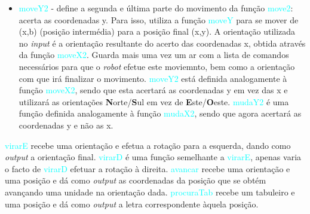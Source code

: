 \documentclass[12pt,a4paper]{article}
\begin{document}
\begin{itemize}
\item \textsf{ \textcolor{cyan}{moveY2} - define a segunda e última parte do movimento da fun\c{c}ão \textcolor{cyan}{move2}: acerta as coordenadas y. Para isso, utiliza a fun\c{c}ão \textcolor{cyan}{moveY} para se mover de (x,b) (posi\c{c}ão intermédia) para a posi\c{c}ão final (x,y). A orienta\c{c}ão utilizada no \textit{input} é a orienta\c{c}ão resultante do acerto das coordenadas x, obtida através da fun\c{c}ão \textcolor{cyan}{moveX2}. Guarda mais uma vez um ar com a lista de comandos necessários para que o \textit{robot} efetue este moviemnto, bem como a orienta\c{c}ão com que irá finalizar o movimento. \textcolor{cyan}{moveY2} está definida analogamente à fun\c{c}ão \textcolor{cyan}{moveX2}, sendo que esta acertará as coordenadas y em vez das x e utilizará as orienta\c{c}ões
\textbf{N}orte/\textbf{S}ul em vez de 
\textbf{E}ste/\textbf{O}este.}
\textsf{ \indent \textcolor{cyan}{mudaY2} é uma fun\c{c}ão definida analogamente à fun\c{c}ão \textcolor{cyan}{mudaX2}, sendo que agora acertará as coordenadas y e não as x.}
\end{itemize}
\indent \textsf{ \indent \textcolor{cyan}{virarE} recebe uma orienta\c{c}ão e efetua a rota\c{c}ão para a esquerda, dando como \textit{output} a orienta\c{c}ão final.} \newline
\indent \textsf{ \textcolor{cyan}{virarD} é uma fun\c{c}ão semelhante a \textcolor{cyan}{virarE}, apenas varia o facto de \textcolor{cyan}{virarD} efetuar a rota\c{c}ão à direita.}
\newline
\indent \textsf{ \textcolor{cyan}{avancar} recebe uma orienta\c{c}ão e uma posi\c{c}ão e dá como \textit{output} as coordenadas da posi\c{c}ão que se obtém avan\c{c}ando uma unidade na orienta\c{c}ão dada.}
\newline
\indent \textsf{ \textcolor{cyan}{procuraTab} recebe um tabuleiro e uma posi\c{c}ão e dá como \textit{output} a letra correspondente àquela posi\c{c}ão.}

\newpage
\end{document}
